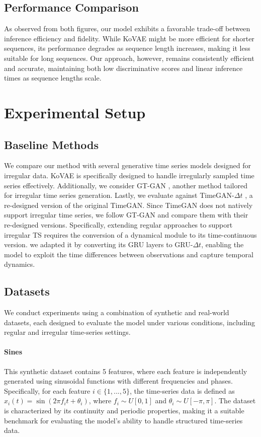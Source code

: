 \documentclass{article}
\theoremstyle{plain}
\theoremstyle{definition}
\theoremstyle{remark}
\begin{document}
{\subsection{Performance Comparison}

As observed from both figures, our model exhibits a favorable trade-off between inference efficiency and fidelity. While KoVAE might be more efficient for shorter sequences, its performance degrades as sequence length increases, making it less suitable for long sequences. Our approach, however, remains consistently efficient and accurate, maintaining both low discriminative scores and linear inference times as sequence lengths scale.

    


\section{Experimental Setup}

\subsection{Baseline Methods}
We compare our method with several generative time series models designed for irregular data. KoVAE \cite{naiman2024generative} is specifically designed to handle irregularly sampled time series effectively. Additionally, we consider GT-GAN \cite{jeon2022gt}, another method tailored for irregular time series generation. Lastly, we evaluate against TimeGAN-$\Delta t$ \cite{yoon2019time}, a re-designed version of the original TimeGAN. Since TimeGAN does not natively support irregular time series, we follow GT-GAN and compare them with their
re-designed versions. Specifically, extending regular approaches to support irregular TS requires the conversion of a dynamical module to its time-continuous version. we adapted it by converting its GRU layers to GRU-$\Delta t$, enabling the model to exploit the time differences between observations and capture temporal dynamics.

\subsection{Datasets}
We conduct experiments using a combination of synthetic and real-world datasets, each designed to evaluate the model under various conditions, including regular and irregular time-series settings.

\paragraph{Sines} 
This synthetic dataset contains 5 features, where each feature is independently generated using sinusoidal functions with different frequencies and phases. Specifically, for each feature \( i \in \{1, ..., 5\} \), the time-series data is defined as \( x_i(t) = \sin(2\pi f_i t + \theta_i) \), where \( f_i \sim U[0, 1] \) and \( \theta_i \sim U[-\pi, \pi] \). The dataset is characterized by its continuity and periodic properties, making it a suitable benchmark for evaluating the model’s ability to handle structured time-series data.

}
\end{document}
